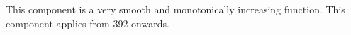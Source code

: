 This component is a very smooth and monotonically increasing function.
This component applies from  392 onwards.